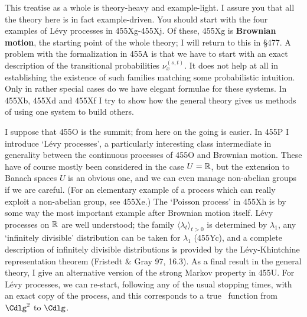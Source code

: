 {This treatise as a whole is theory-heavy and example-light.   I assure you
that all the theory here is in fact example-driven.   You should start with
the four examples of L\'evy processes in
455Xg-455Xj.   %
Of these, 455Xg is {\bf Brownian motion}, the starting point
of the whole theory;  I will return to this in \S477.   A problem with the
formalization in 455A is that we have to start with an exact description of
the transitional probabilities $\nu^{(s,t)}_x$.   It does not help at all
in establishing the existence of such families matching
some probabilistic intuition.   Only in rather special cases do we have
elegant formulae for these systems.   In 455Xb, 455Xd and 455Xf I try to
show how the general theory gives us methods of using one
system to build others.

I suppose that 455O is the summit;  from here on the going is easier.
In 455P I introduce `L\'evy processes', a particularly interesting class
intermediate in generality between the continuous processes of 455O and
Brownian motion.   These have of course mostly been considered in the case
$U=\Bbb R$, but the extension to
Banach spaces $U$ is an obvious one, and we
can even manage non-abelian groups if we are careful.   (For an elementary
example of a process which can really exploit a non-abelian group,
see 455Xe.)   The `Poisson process' in 455Xh is by some way the most
important example after Brownian motion itself.
L\'evy processes on $\Bbb R$ are well understood;  the family
$\langle\lambda_t\rangle_{t>0}$ is determined by $\lambda_1$, any
`infinitely divisible' distribution can be taken for $\lambda_1$
(455Yc), and
a complete description of infinitely divisible distributions is provided by
the L\'evy-Khintchine representation theorem ({\smc Fristedt \& Gray 97},
16.3).
As a final result in the general theory, I give an alternative version of
the strong Markov property in 455U.   For L\'evy processes, we can
re-start, following any of the usual stopping times,
with an exact copy of the process,
and this corresponds to a true \imp\ function from $\Cdlg^2$ to $\Cdlg$.

}
